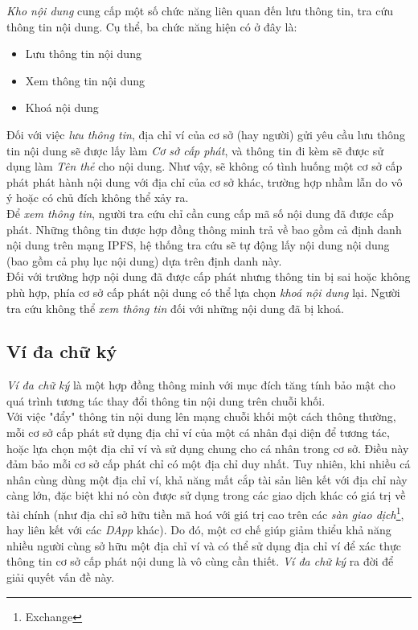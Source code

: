 \textit{Kho nội dung} cung cấp một số chức năng liên quan đến lưu thông tin, tra cứu thông tin nội dung. Cụ thể, ba chức năng hiện có ở đây là:
\begin{itemize}
    \item Lưu thông tin nội dung
    \item Xem thông tin nội dung
    \item Khoá nội dung
\end{itemize}

Đối với việc \textit{lưu thông tin}, địa chỉ ví của cơ sở (hay người) gửi yêu cầu lưu thông tin nội dung sẽ được lấy làm \textit{Cơ sở cấp phát}, và thông tin đi kèm sẽ được sử dụng làm \textit{Tên thẻ} cho nội dung. Như vậy, sẽ không có tình huống một cơ sở cấp phát phát hành nội dung với địa chỉ của cơ sở khác, trường hợp nhầm lẫn do vô ý hoặc có chủ đích không thể xảy ra.\\

Để \textit{xem thông tin}, người tra cứu chỉ cần cung cấp mã số nội dung đã được cấp phát. Những thông tin được hợp đồng thông minh trả về bao gồm cả định danh nội dung trên mạng IPFS, hệ thống tra cứu sẽ tự động lấy nội dung nội dung (bao gồm cả phụ lục nội dung) dựa trên định danh này.\\

Đối với trường hợp nội dung đã được cấp phát nhưng thông tin bị sai hoặc không phù hợp, phía cơ sở cấp phát nội dung có thể lựa chọn \textit{khoá nội dung} lại. Người tra cứu không thể \textit{xem thông tin} đối với những nội dung đã bị khoá.

\subsection{Ví đa chữ ký}
\textit{Ví đa chữ ký} là một hợp đồng thông minh với mục đích tăng tính bảo mật cho quá trình tương tác thay đổi thông tin nội dung trên chuỗi khối.\\

Với việc "đẩy" thông tin nội dung lên mạng chuỗi khối một cách thông thường, mỗi cơ sở cấp phát sử dụng địa chỉ ví của một cá nhân đại diện để tương tác, hoặc lựa chọn một địa chỉ ví và sử dụng chung cho cá nhân trong cơ sở. Điều này đảm bảo mỗi cơ sở cấp phát chỉ có một địa chỉ duy nhất. Tuy nhiên, khi nhiều cá nhân cùng dùng một địa chỉ ví, khả năng mất cắp tài sản liên kết với địa chỉ này càng lớn, đặc biệt khi nó còn được sử dụng trong các giao dịch khác có giá trị về tài chính (như địa chỉ sở hữu tiền mã hoá với giá trị cao trên các \textit{sàn giao dịch}\footnote{Exchange}, hay liên kết với các \textit{DApp} khác). Do đó, một cơ chế giúp giảm thiểu khả năng nhiều người cùng sở hữu một địa chỉ ví và có thể sử dụng địa chỉ ví để xác thực thông tin cơ sở cấp phát nội dung là vô cùng cần thiết. \textit{Ví đa chữ ký} ra đời để giải quyết vấn đề này.\\

